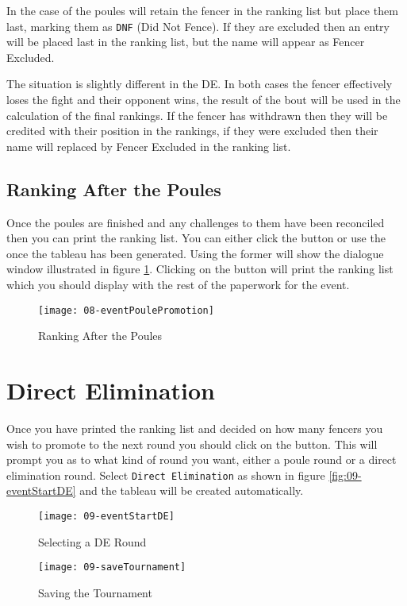 \documentclass[a4paper,11pt]{memoir}
\begin{document}
In the case of the poules \fencingtime{} will retain the fencer in the ranking list but place them last, marking them as \texttt{DNF} (Did Not Fence). If they are excluded then an entry will be placed last in the ranking list, but the name will appear as Fencer Excluded.

The situation is slightly different in the DE. In both cases the fencer effectively loses the fight and their opponent wins, the result of the bout will be used in the calculation of the final rankings. If the fencer has withdrawn then they will be credited with their position in the rankings, if they were excluded then their name will replaced by Fencer Excluded in the ranking list.

\section{Ranking After the Poules}

Once the poules are finished and any challenges to them have been reconciled then you can print the ranking list. You can either click the  button or use the  once the tableau has been generated. Using the former will show the dialogue window illustrated in figure \ref{fig:08-eventPoulePromotion}. Clicking on the  button will print the ranking list which you should display with the rest of the paperwork for the event.

\begin{figure}[!ht]
 \centering
 \texttt{[image: 08-eventPoulePromotion]}
 \caption{Ranking After the Poules} \label{fig:08-eventPoulePromotion}
\end{figure}

\chapter{Direct Elimination}
Once you have printed the ranking list and decided on how many fencers you wish to promote to the next round you should click on the  button.  This will prompt you as to what kind of round you want, either a poule round or a direct elimination round. Select \texttt{Direct Elimination} as shown in figure \ref{fig:09-eventStartDE} and the tableau will be created automatically. 

\begin{figure}[!ht]
 \centering
 \begin{minipage}{0.4\textwidth}
  \centering
  \texttt{[image: 09-eventStartDE]}
  \caption{Selecting a DE Round} \label{fig:09-eventStartDE}
 \end{minipage}
 \hfill
  \begin{minipage}{0.4\textwidth}
  \centering
  \texttt{[image: 09-saveTournament]}
  \caption{Saving the Tournament} \label{fig:09-saveTournament}
 \end{minipage}
\end{figure}
\end{document}
